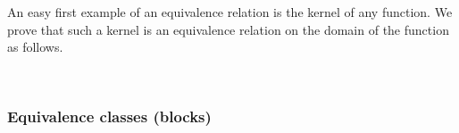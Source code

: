 An easy first example of an equivalence relation is the kernel of any function. We prove that such a kernel is an equivalence relation on the domain of the function as follows.
\ccpad
\begin{code}%
\>[0][@{}l@{\AgdaIndent{1}}]%
\>[1]\AgdaSpace{}%
\AgdaSymbol{:}\AgdaSpace{}%
\AgdaSymbol{\{}\AgdaSpace{}%
\AgdaSymbol{:}\AgdaSpace{}%
\AgdaSpace{}%
\AgdaSymbol{\}\{}\AgdaSpace{}%
\AgdaSymbol{:}\AgdaSpace{}%
\AgdaSpace{}%
\AgdaSymbol{\}(}\AgdaSpace{}%
\AgdaSymbol{:}\AgdaSpace{}%
\AgdaSpace{}%
\AgdaSpace{}%
\AgdaSymbol{)}\AgdaSpace{}%
\AgdaSpace{}%
\AgdaSpace{}%
\AgdaSymbol{(}\AgdaSpace{}%
\AgdaSymbol{)}\<%
\\
%
\>[1]\AgdaSpace{}%
\AgdaSpace{}%
\AgdaSymbol{=}\AgdaSpace{}%
\AgdaSpace{}%
\AgdaSymbol{\{}\AgdaSpace{}%
\AgdaSpace{}%
\AgdaSymbol{=}\AgdaSpace{}%
\AgdaSymbol{;}\AgdaSpace{}%
\AgdaSpace{}%
\AgdaSymbol{=}\AgdaSpace{}%
\AgdaSpace{}%
\AgdaSpace{}%
\AgdaSpace{}%
\AgdaSpace{}%
\AgdaSpace{}%
\AgdaSymbol{;}\AgdaSpace{}%
\AgdaSpace{}%
\AgdaSymbol{=}\AgdaSpace{}%
\AgdaSpace{}%
\AgdaSpace{}%
\AgdaSpace{}%
\AgdaSpace{}%
\AgdaSpace{}%
\AgdaSpace{}%
\AgdaSpace{}%
\AgdaSymbol{\}}\<%
\end{code}



\subsubsection{Equivalence classes (blocks)}\label{equivalence-classes-1}

